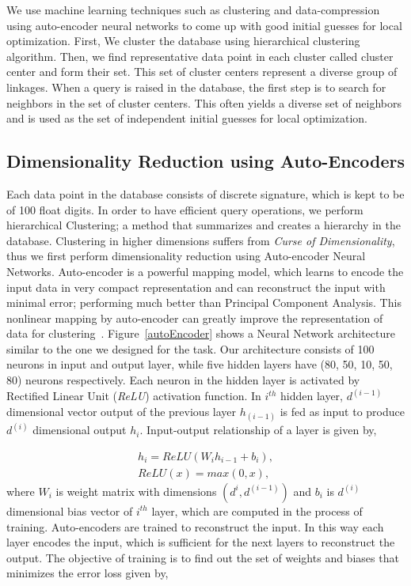 \documentclass[twocolumn,10pt]{asme2ej}
\begin{document}
We use machine learning techniques such as clustering and data-compression using auto-encoder neural networks to come up with good initial guesses for local optimization.
First, We cluster the database using hierarchical clustering algorithm.
Then, we find representative data point in each cluster called cluster center and form their set.
This set of cluster centers represent a diverse group of linkages.
When a query is raised in the database, the first step is to search for neighbors in the set of cluster centers.
This often yields a diverse set of neighbors and is used as the set of independent initial guesses for local optimization.

\subsection{Dimensionality Reduction using Auto-Encoders}
Each data point in the database consists of discrete signature, which is kept to be of 100 float digits.
In order to have efficient query operations, we perform hierarchical Clustering; a method that summarizes and creates a hierarchy in the database.
Clustering in higher dimensions suffers from \emph{Curse of Dimensionality}\cite{marimont1979}, thus we first perform dimensionality reduction using Auto-encoder Neural Networks.
Auto-encoder is a powerful mapping model, which learns to encode the input data in very compact representation and can reconstruct the input with minimal error; performing much better than Principal Component Analysis\cite{hinton2006}.
This nonlinear mapping by auto-encoder can greatly improve the representation of data for clustering~\cite{song2013}.
Figure~\ref{autoEncoder} shows a Neural Network architecture similar to the one we designed for the task.
Our architecture consists of 100 neurons in input and output layer, while five hidden layers have (80, 50, 10, 50, 80) neurons respectively.
Each neuron in the hidden layer is activated by Rectified Linear Unit (\emph{ReLU}) activation function.
In $i^{th}$ hidden layer, $d^{(i-1)}$ dimensional vector output of the previous layer $h_(i-1)$ is fed as input to produce $d^{(i)}$ dimensional output $h_i$.
Input-output relationship of a layer is given by,

\begin{eqnarray}\label{nnlayer}
  h_i = ReLU(W_{i}h_{i-1} + b_{i}), \\
  ReLU(x) = max(0, x),
\end{eqnarray}
where $W_i$ is weight matrix with dimensions $(d^{i}, d^{(i-1)})$ and $b_i$ is $d^{(i)}$ dimensional bias vector of $i^{th}$ layer, which are computed in the process of training.
Auto-encoders are trained to reconstruct the input.
In this way each layer encodes the input, which is sufficient for the next layers to reconstruct the output.
The objective of training is to find out the set of weights and biases that minimizes the error loss given by,
\end{document}
